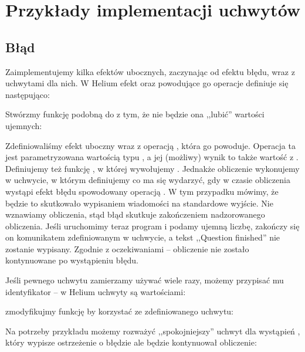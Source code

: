 \section{Przykłady implementacji uchwytów}

\subsection{Błąd}

Zaimplementujemy kilka efektów ubocznych, zaczynając od efektu błędu, wraz z uchwytami dla nich. W Helium efekt oraz powodujące go operacje definiuje się następująco:



Stwórzmy funkcję podobną do  z tym, że nie będzie ona ,,lubić'' wartości ujemnych:



Zdefiniowaliśmy efekt uboczny  wraz z operacją , która go powoduje. Operacja ta jest parametryzowana wartością typu , a jej (możliwy) wynik to także wartość z . Definiujemy też funkcję , w której wywołujemy . Jednakże obliczenie wykonujemy w uchwycie, w którym definiujemy co ma się wydarzyć, gdy w czasie obliczenia wystąpi efekt błędu spowodowany operacją . W tym przypadku mówimy, że będzie to skutkowało wypisaniem wiadomości na standardowe wyjście. Nie wznawiamy obliczenia, stąd błąd skutkuje zakończeniem nadzorowanego obliczenia. Jeśli uruchomimy teraz program i podamy ujemną liczbę, zakończy się on komunikatem zdefiniowanym w uchwycie, a tekst ,,Question finished'' nie zostanie wypisany. Zgodnie z oczekiwaniami -- obliczenie  nie zostało kontynuowane po wystąpieniu błędu.

Jeśli pewnego uchwytu zamierzamy używać wiele razy, możemy przypisać mu identyfikator -- w Helium uchwyty są wartościami:



zmodyfikujmy funkcję  by korzystać ze zdefiniowanego uchwytu:



Na potrzeby przykładu możemy rozważyć ,,spokojniejszy'' uchwyt dla wystąpień , który wypisze ostrzeżenie o błędzie ale będzie kontynuował obliczenie:

